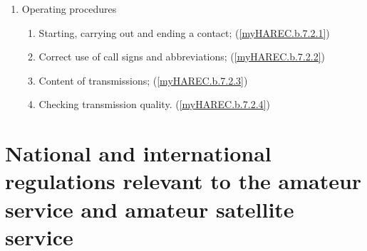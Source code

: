 \begin{enumerate}
\begin{enumerate}
\item Operating procedures
\begin{enumerate}
\item Starting, carrying out and ending a contact;
  (\ref{myHAREC.b.7.2.1})\label{HAREC.b.7.2.1}
\item Correct use of call signs and abbreviations;
  (\ref{myHAREC.b.7.2.2})\label{HAREC.b.7.2.2}
\item Content of transmissions;
  (\ref{myHAREC.b.7.2.3})\label{HAREC.b.7.2.3}
\item Checking transmission quality.
  (\ref{myHAREC.b.7.2.4})\label{HAREC.b.7.2.4}
\end{enumerate}
\end{enumerate}

\end{enumerate}

\section[Regulations]{National and international regulations relevant to the amateur service and amateur satellite service}

